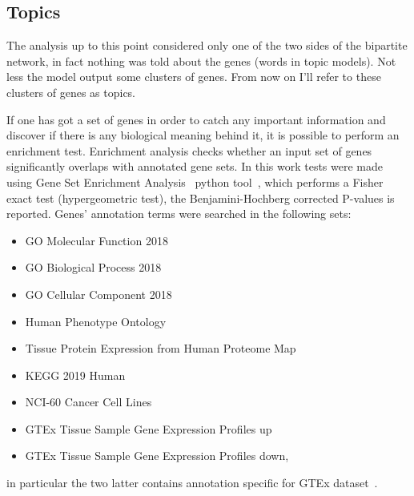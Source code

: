 \subsection{Topics}
The analysis up to this point considered only one of the two sides of the bipartite network, in fact nothing was told about the genes (words in topic models).
Not less the model output some clusters of genes.  From now on I'll refer to these clusters of genes as topics.

If one has got a set of genes in order to catch any important information and discover if there is any biological meaning behind it, it is possible to perform an enrichment test. Enrichment analysis checks whether an input set of genes significantly overlaps with annotated gene sets.
In this work tests were made using Gene Set Enrichment Analysis~\cite{subramanian2005gene} python tool~\cite{Kuleshov2016}, which performs a Fisher exact test (hypergeometric test), the Benjamini-Hochberg corrected P-values is reported. Genes' annotation terms were searched in the following sets: 
\begin{itemize}
		\item GO Molecular Function 2018
		\item GO Biological Process 2018
		\item GO Cellular Component 2018
		\item Human Phenotype Ontology
		\item Tissue Protein Expression from Human Proteome Map
		\item KEGG 2019 Human
		\item NCI-60 Cancer Cell Lines
		\item GTEx Tissue Sample Gene Expression Profiles up
		\item GTEx Tissue Sample Gene Expression Profiles down,
\end{itemize}
in particular the two latter contains annotation specific for GTEx dataset~\cite{Ardlie2015}.

